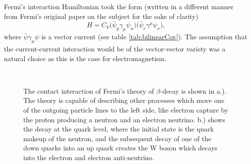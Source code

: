 Fermi's interaction Hamiltonian took the form (written in a different manner from Fermi's original
paper on the subject for the sake of clarity) 
%
\begin{equation}
  H = C_V\big( \bar{\psi}_p \gamma_\mu \psi_n \big) \big( \bar{\psi}_e \gamma^\mu \psi_\nu \big), 
\end{equation}
%
where $\bar{\psi} \gamma_\mu \psi$ is a vector current (see table \ref{tab:bilinearCov}). The assumption
that the current-current interaction would be of the vector-vector variety was a natural
choice as this is the case for electromagnetism.

\begin{figure}
  \centering
  \centering
  \\
  \caption{The contact interaction of Fermi's theory of $\beta$-decay is shown in a.). The theory is
    capable of describing other processes which move one of the outgoing particle lines
    to the left side, like electron capture by the proton producing a neutron and an
    electron neutrino. b.) shows the decay at the quark level, where the initial state is the
    quark makeup of the neutron, and the subsequent decay of one of the down quarks into an up
    quark creates the W boson which decays into the electron and electron anti-neutrino.}
  \label{fig:pointInteraction}
\end{figure}

